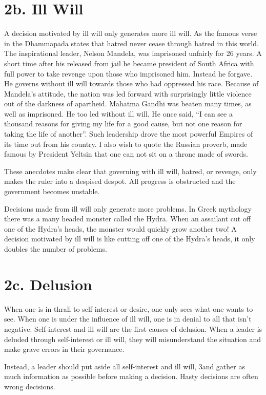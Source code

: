 \documentclass[12pt, openany]{book}
\begin{document}
\section{2b. Ill Will}

A decision motivated by ill will only generates more ill will. As the famous verse in the Dhammapada states that hatred never cease through hatred in this world. The inspirational leader, Nelson Mandela, was imprisoned unfairly for 26 years. A short time after his released from jail he became president of South Africa with full power to take revenge upon those who imprisoned him. Instead he forgave. He governs without ill will towards those who had oppressed his race. Because of Mandela’s attitude, the nation was led forward with surprisingly little violence out of the darkness of apartheid.
Mahatma Gandhi was beaten many times, as well as imprisoned. He too led without ill will. He once said, “I can see a thousand reasons for giving my life for a good cause, but not one reason for taking the life of another”. Such leadership drove the most powerful Empires of its time out from his country. I also wish to quote the Russian proverb, made famous by President Yeltsin that one can not sit on a throne made of swords.

These anecdotes make clear that governing with ill will, hatred, or revenge, only makes the ruler into a despised despot. All progress is obstructed and the government becomes unstable.

Decisions made from ill will only generate more problems. In Greek mythology there was a many headed monster called the Hydra. When an assailant cut off one of the Hydra’s heads, the monster would quickly grow another two! A decision motivated by ill will is like cutting off one of the Hydra’s heads, it only doubles the number of problems.

\section{2c. Delusion}

When one is in thrall to self-interest or desire, one only sees what one wants to see. When one is under the influence of ill will, one is in denial to all that isn’t negative. Self-interest and ill will are the first causes of delusion. When a leader is deluded through self-interest or ill will, they will misunderstand the situation and make grave errors in their governance.

Instead, a leader should put aside all self-interest and ill will, 3and gather as much information as possible before making a decision. Hasty decisions are often wrong decisions.
\end{document}
